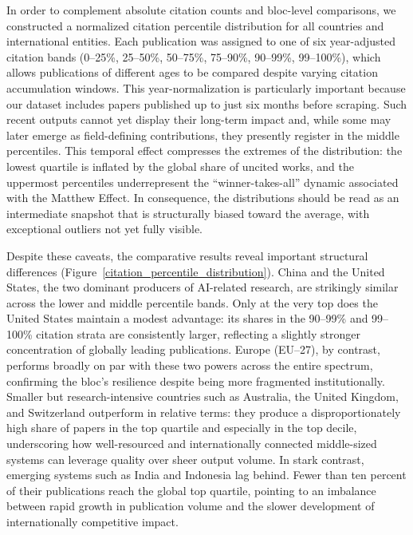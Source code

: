 \documentclass{article}
\begin{document}
In order to complement absolute citation counts and bloc-level comparisons, we constructed a normalized citation percentile distribution for all countries and international entities. Each publication was assigned to one of six year-adjusted citation bands (0--25\%, 25--50\%, 50--75\%, 75--90\%, 90--99\%, 99--100\%), which allows publications of different ages to be compared despite varying citation accumulation windows. This year-normalization is particularly important because our dataset includes papers published up to just six months before scraping. Such recent outputs cannot yet display their long-term impact and, while some may later emerge as field-defining contributions, they presently register in the middle percentiles. This temporal effect compresses the extremes of the distribution: the lowest quartile is inflated by the global share of uncited works, and the uppermost percentiles underrepresent the ``winner-takes-all'' dynamic associated with the Matthew Effect. In consequence, the distributions should be read as an intermediate snapshot that is structurally biased toward the average, with exceptional outliers not yet fully visible.

Despite these caveats, the comparative results reveal important structural differences (Figure~\ref{citation_percentile_distribution}). China and the United States, the two dominant producers of AI-related research, are strikingly similar across the lower and middle percentile bands. Only at the very top does the United States maintain a modest advantage: its shares in the 90--99\% and 99--100\% citation strata are consistently larger, reflecting a slightly stronger concentration of globally leading publications. Europe (EU--27), by contrast, performs broadly on par with these two powers across the entire spectrum, confirming the bloc’s resilience despite being more fragmented institutionally. Smaller but research-intensive countries such as Australia, the United Kingdom, and Switzerland outperform in relative terms: they produce a disproportionately high share of papers in the top quartile and especially in the top decile, underscoring how well-resourced and internationally connected middle-sized systems can leverage quality over sheer output volume. In stark contrast, emerging systems such as India and Indonesia lag behind. Fewer than ten percent of their publications reach the global top quartile, pointing to an imbalance between rapid growth in publication volume and the slower development of internationally competitive impact.
\end{document}
